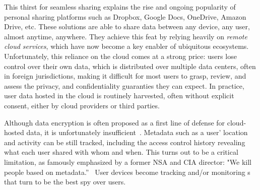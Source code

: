 This thirst for seamless sharing explains the rise and ongoing popularity
of personal sharing platforms such as Dropbox, Google Docs,
OneDrive, Amazon Drive, etc. These solutions are able to share data between any device, any user, almost
anytime, anywhere. They achieve this feat by relying heavily on
\emph{remote cloud services}, which have now become a key enabler of ubiquitous ecosystems. 
Unfortunately, this reliance on the cloud comes at a strong price: 
users lose control over their own data, which is distributed over
multiple data centers, often in foreign jurisdictions, making it difficult for most users to grasp, review, and assess the privacy, and
confidentiality guaranties they can expect. In practice, user data hosted in the cloud is routinely harvested, often without explicit
consent, either by cloud providers or third parties.

Although data encryption is often proposed as a first line of defense for cloud-hosted data, it is unfortunately  insufficient~\cite{granick_2017, HooffLZZ15, HarnikPS10}. Metadata such as a user'
location and activity can be still tracked, including the access
control history revealing what each user shared with whom and when. 
This turns out to be a critical limitation, as famously emphasized by a former NSA and CIA director: "We kill people based on metadata.''~\cite{NaughtonTheGuardian2016} 
User devices become tracking and/or monitoring \squad{}s that turn to
be the best spy over users. 

